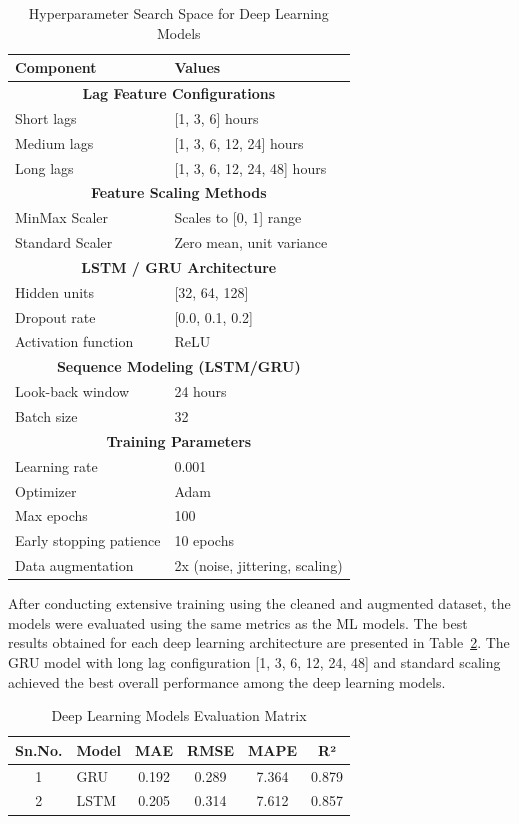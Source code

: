 \documentclass[oneside, 12pt]{book}
\numberwithin{equation}{chapter}
\begin{document}
\begin{table}[H]
\centering
\caption{Hyperparameter Search Space for Deep Learning Models}
\label{tab:dl_hyperparams}
\begin{tabular}{ll}
\hline
\textbf{Component} & \textbf{Values} \\
\hline
\multicolumn{2}{c}{\textbf{Lag Feature Configurations}} \\
\hline
Short lags & [1, 3, 6] hours \\
Medium lags & [1, 3, 6, 12, 24] hours \\
Long lags & [1, 3, 6, 12, 24, 48] hours \\
\hline
\multicolumn{2}{c}{\textbf{Feature Scaling Methods}} \\
\hline
MinMax Scaler & Scales to [0, 1] range \\
Standard Scaler & Zero mean, unit variance \\
\hline
\multicolumn{2}{c}{\textbf{LSTM / GRU Architecture}} \\
\hline
Hidden units & [32, 64, 128] \\
Dropout rate & [0.0, 0.1, 0.2] \\
Activation function & ReLU \\
\hline
\multicolumn{2}{c}{\textbf{Sequence Modeling (LSTM/GRU)}} \\
\hline
Look-back window & 24 hours \\
Batch size & 32 \\
\hline
\multicolumn{2}{c}{\textbf{Training Parameters}} \\
\hline
Learning rate & 0.001 \\
Optimizer & Adam \\
Max epochs & 100 \\
Early stopping patience & 10 epochs \\
Data augmentation & 2x (noise, jittering, scaling) \\
\hline
\end{tabular}
\end{table}

After conducting extensive training using the cleaned and augmented dataset, the models were evaluated using the same metrics as the ML models. The best results obtained for each deep learning architecture are presented in Table~\ref{tab:dl_results}. The GRU model with long lag configuration [1, 3, 6, 12, 24, 48] and standard scaling achieved the best overall performance among the deep learning models.

\begin{table}[H]
\centering
\caption{Deep Learning Models Evaluation Matrix}
\label{tab:dl_results}
\begin{tabular}{|c|l|c|c|c|c|}
\hline
\textbf{Sn.No.} & \textbf{Model} & \textbf{MAE} & \textbf{RMSE} & \textbf{MAPE} & \textbf{R²} \\
\hline
1 & GRU & 0.192 & 0.289 & 7.364 & 0.879 \\
\hline
2 & LSTM & 0.205 & 0.314 & 7.612 & 0.857 \\
\hline
\end{tabular}
\end{table}
\end{document}
